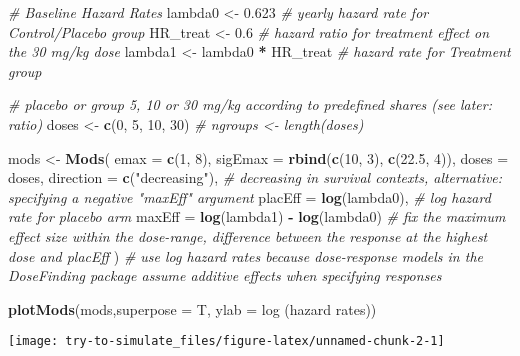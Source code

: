 \documentclass[
]{article}
\newenvironment{Shaded}{\begin{snugshade}}{\end{snugshade}}
\newcommand{\AttributeTok}[1]{\textcolor[rgb]{0.13,0.29,0.53}{#1}}
\newcommand{\CommentTok}[1]{\textcolor[rgb]{0.56,0.35,0.01}{\textit{#1}}}
\newcommand{\DecValTok}[1]{\textcolor[rgb]{0.00,0.00,0.81}{#1}}
\newcommand{\FloatTok}[1]{\textcolor[rgb]{0.00,0.00,0.81}{#1}}
\newcommand{\FunctionTok}[1]{\textcolor[rgb]{0.13,0.29,0.53}{\textbf{#1}}}
\newcommand{\NormalTok}[1]{#1}
\newcommand{\OtherTok}[1]{\textcolor[rgb]{0.56,0.35,0.01}{#1}}
\newcommand{\SpecialCharTok}[1]{\textcolor[rgb]{0.81,0.36,0.00}{\textbf{#1}}}
\newcommand{\StringTok}[1]{\textcolor[rgb]{0.31,0.60,0.02}{#1}}
\begin{document}
\begin{Shaded}
\begin{Highlighting}[]
\CommentTok{\# Baseline Hazard Rates}
\NormalTok{lambda0 }\OtherTok{\textless{}{-}} \FloatTok{0.623} \CommentTok{\# yearly hazard rate for Control/Placebo group}
\NormalTok{HR\_treat }\OtherTok{\textless{}{-}} \FloatTok{0.6} \CommentTok{\# hazard ratio for treatment effect on the 30 mg/kg dose}
\NormalTok{lambda1 }\OtherTok{\textless{}{-}}\NormalTok{ lambda0 }\SpecialCharTok{*}\NormalTok{ HR\_treat }\CommentTok{\#  hazard rate for Treatment group}

\CommentTok{\# placebo or group 5, 10 or 30 mg/kg according to predefined shares (see later: ratio)}
\NormalTok{doses }\OtherTok{\textless{}{-}} \FunctionTok{c}\NormalTok{(}\DecValTok{0}\NormalTok{, }\DecValTok{5}\NormalTok{, }\DecValTok{10}\NormalTok{, }\DecValTok{30}\NormalTok{)}
\CommentTok{\# ngroups \textless{}{-} length(doses) }

\NormalTok{mods }\OtherTok{\textless{}{-}} \FunctionTok{Mods}\NormalTok{(}
  \AttributeTok{emax =} \FunctionTok{c}\NormalTok{(}\DecValTok{1}\NormalTok{, }\DecValTok{8}\NormalTok{),}
  \AttributeTok{sigEmax =} \FunctionTok{rbind}\NormalTok{(}\FunctionTok{c}\NormalTok{(}\DecValTok{10}\NormalTok{, }\DecValTok{3}\NormalTok{), }\FunctionTok{c}\NormalTok{(}\FloatTok{22.5}\NormalTok{, }\DecValTok{4}\NormalTok{)),}
  \AttributeTok{doses =}\NormalTok{ doses,}
  \AttributeTok{direction =} \FunctionTok{c}\NormalTok{(}\StringTok{"decreasing"}\NormalTok{), }\CommentTok{\# decreasing in survival contexts, alternative:  specifying a negative "maxEff" argument}
  \AttributeTok{placEff =} \FunctionTok{log}\NormalTok{(lambda0), }\CommentTok{\# log hazard rate for placebo arm}
  \AttributeTok{maxEff =} \FunctionTok{log}\NormalTok{(lambda1) }\SpecialCharTok{{-}} \FunctionTok{log}\NormalTok{(lambda0) }\CommentTok{\# fix the maximum effect size within the dose{-}range, difference between the response at the highest dose and placEff}
\NormalTok{)}
\CommentTok{\# use log hazard rates because dose{-}response models in the DoseFinding package assume additive effects when specifying responses}

\FunctionTok{plotMods}\NormalTok{(mods,}\AttributeTok{superpose =}\NormalTok{ T, }\AttributeTok{ylab =} \StringTok{\textquotesingle{}log (hazard rates)\textquotesingle{}}\NormalTok{)}
\end{Highlighting}
\end{Shaded}

\texttt{[image: try-to-simulate\_files/figure-latex/unnamed-chunk-2-1]}
\end{document}
